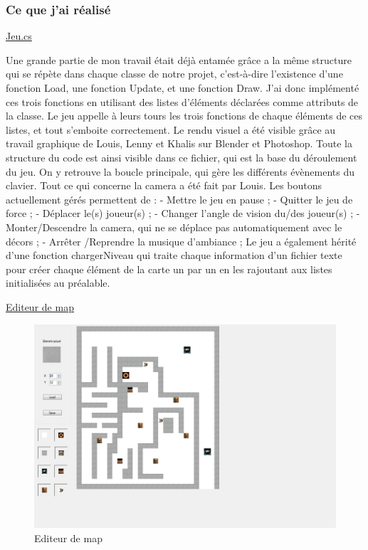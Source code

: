 \documentclass{article}
\begin{document}
\subsubsection {Ce que j'ai réalisé}
\underline{Jeu.cs}
\par
Une grande partie de mon travail était déjà entamée grâce a la même structure qui se répète dans chaque classe de notre projet, c’est-à-dire l’existence d’une fonction Load, une fonction Update, et une fonction Draw. J’ai donc implémenté ces trois fonctions en utilisant des listes d’éléments déclarées comme attributs de la classe. Le jeu appelle à leurs tours les trois fonctions de chaque éléments de ces listes, et tout s’emboite correctement. Le rendu visuel a été visible grâce au travail graphique de Louis, Lenny et Khalis sur Blender et Photoshop. Toute la structure du code est ainsi visible dans ce fichier, qui est la base du déroulement du jeu. On y retrouve la boucle principale, qui gère les différents évènements du clavier. Tout ce qui concerne la camera a été fait par Louis. Les boutons actuellement gérés permettent de :
- Mettre le jeu en pause ;
- Quitter le jeu de force ;
- Déplacer le(s) joueur(s) ;
- Changer l’angle de vision du/des joueur(s) ;
- Monter/Descendre la camera, qui ne se déplace pas automatiquement avec le décors ;
- Arrêter /Reprendre la musique d’ambiance ;
Le jeu a également hérité d’une fonction chargerNiveau qui traite chaque information d’un fichier texte pour créer chaque élément de la carte un par un en les rajoutant aux listes initialisées au préalable.
\newline

\newpage
\underline{Editeur de map}

\begin{figure}[h]
\begin{center}
\includegraphics[scale=0.4]{editeur.png}
\caption{Editeur de map}
\end{center}
\end{figure}
\end{document}
